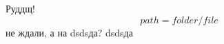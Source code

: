 \documentclass[12pt]{article}
\begin{document}
Руддщ!
\begin{equation}
path=folder/file
\end{equation}
не ждали, а на
dsdsда?
dsdsда
\end{document}
